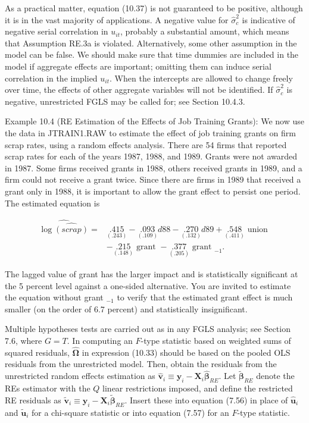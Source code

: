 \documentclass[10pt]{article}
\begin{document}
As a practical matter, equation (10.37) is not guaranteed to be positive, although it is in the vast majority of applications. A negative value for $\hat{\sigma}_{c}^{2}$ is indicative of negative serial correlation in $u_{i t}$, probably a substantial amount, which means that Assumption RE.3a is violated. Alternatively, some other assumption in the model can be false. We should make sure that time dummies are included in the model if aggregate effects are important; omitting them can induce serial correlation in the implied $u_{i t}$. When the intercepts are allowed to change freely over time, the effects of other aggregate variables will not be identified. If $\hat{\sigma}_{c}^{2}$ is negative, unrestricted FGLS may be called for; see Section 10.4.3.

Example 10.4 (RE Estimation of the Effects of Job Training Grants): We now use the data in JTRAIN1.RAW to estimate the effect of job training grants on firm scrap rates, using a random effects analysis. There are 54 firms that reported scrap rates for each of the years 1987, 1988, and 1989. Grants were not awarded in 1987. Some firms received grants in 1988, others received grants in 1989, and a firm could not receive a grant twice. Since there are firms in 1989 that received a grant only in 1988, it is important to allow the grant effect to persist one period. The estimated equation is

$$
\begin{aligned}
\widehat{\log \widehat{(s c r a p)}}= & \underset{(.243)}{.415}-\underset{(.109)}{.093} d 88-\underset{(.132)}{.270} d 89+\underset{(.411)}{.548} \text { union } \\
& -\underset{(.148)}{.215} \text { grant }-\underset{(.205)}{.377} \text { grant }_{-1} .
\end{aligned}
$$

The lagged value of grant has the larger impact and is statistically significant at the 5 percent level against a one-sided alternative. You are invited to estimate the equation without grant $_{-1}$ to verify that the estimated grant effect is much smaller (on the order of 6.7 percent) and statistically insignificant.

Multiple hypotheses tests are carried out as in any FGLS analysis; see Section 7.6, where $G=T$. In computing an $F$-type statistic based on weighted sums of squared residuals, $\hat{\boldsymbol{\Omega}}$ in expression (10.33) should be based on the pooled OLS residuals from the unrestricted model. Then, obtain the residuals from the unrestricted random effects estimation as $\hat{\mathbf{v}}_{i} \equiv \mathbf{y}_{i}-\mathbf{X}_{i} \hat{\boldsymbol{\beta}}_{R E}$. Let $\tilde{\boldsymbol{\beta}}_{R E}$ denote the REs estimator with the $Q$ linear restrictions imposed, and define the restricted RE residuals as $\tilde{\mathbf{v}}_{i} \equiv \mathbf{y}_{i}-\mathbf{X}_{i} \tilde{\boldsymbol{\beta}}_{R E}$. Insert these into equation (7.56) in place of $\hat{\mathbf{u}}_{i}$ and $\tilde{\mathbf{u}}_{i}$ for a chi-square statistic or into equation (7.57) for an $F$-type statistic.
\end{document}
